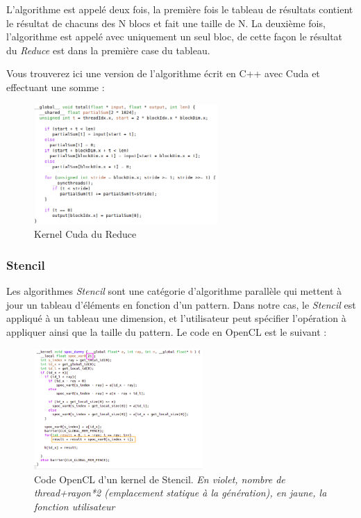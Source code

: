 \documentclass{report}
\begin{document}
L'algorithme est appelé deux fois, la première fois le tableau de résultats contient le résultat de chacuns des N blocs et fait une taille de N. La deuxième fois, l'algorithme est appelé avec uniquement un seul bloc, de cette façon le résultat du \textit{Reduce} est dans la première case du tableau.\newline

Vous trouverez ici une version de l'algorithme écrit en C++ avec Cuda et effectuant une somme : \newline
 
\begin{figure}[!h]
\begin{center}
\includegraphics[height=130pt]{images_finales/reduce.png}
\end{center}
\caption{Kernel Cuda du Reduce}
\label{test10}
\end{figure}

\subsubsection{Stencil}
Les algorithmes \textit{Stencil} sont une catégorie d'algorithme parallèle qui mettent à jour un tableau d'éléments en fonction d'un pattern. Dans notre cas, le \textit{Stencil} est appliqué à un tableau une dimension, et l'utilisateur peut spécifier l'opération à appliquer ainsi que la taille du pattern. Le code en OpenCL est le suivant :\newline

\begin{figure}[!h]
\begin{center}
\includegraphics[height=130pt]{images_finales/Stencil_kernel.png}
\end{center}
\caption{Code OpenCL d'un kernel de Stencil. \textit{En violet, nombre de thread+rayon*2 (emplacement statique à la génération), en jaune, la fonction utilisateur}}
\label{test11}
\end{figure}
\newpage
\end{document}
